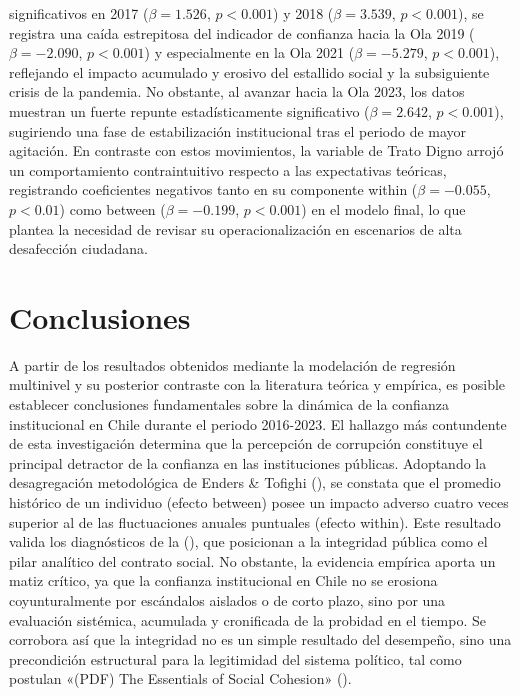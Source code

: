 \documentclass[
  spanish,
  a4paper,
  oneside]{scrbook}
\begin{document}
significativos en 2017 (\(\beta = 1.526\), \(p < 0.001\)) y 2018
(\(\beta = 3.539\), \(p < 0.001\)), se registra una caída estrepitosa
del indicador de confianza hacia la Ola 2019 (\(\beta = -2.090\),
\(p < 0.001\)) y especialmente en la Ola 2021 (\(\beta = -5.279\),
\(p < 0.001\)), reflejando el impacto acumulado y erosivo del estallido
social y la subsiguiente crisis de la pandemia. No obstante, al avanzar
hacia la Ola 2023, los datos muestran un fuerte repunte estadísticamente
significativo (\(\beta = 2.642\), \(p < 0.001\)), sugiriendo una fase de
estabilización institucional tras el periodo de mayor agitación. En
contraste con estos movimientos, la variable de Trato Digno arrojó un
comportamiento contraintuitivo respecto a las expectativas teóricas,
registrando coeficientes negativos tanto en su componente within
(\(\beta = -0.055\), \(p < 0.01\)) como between (\(\beta = -0.199\),
\(p < 0.001\)) en el modelo final, lo que plantea la necesidad de
revisar su operacionalización en escenarios de alta desafección
ciudadana.


\chapter{Conclusiones}\label{conclusiones}

A partir de los resultados obtenidos mediante la modelación de regresión
multinivel y su posterior contraste con la literatura teórica y
empírica, es posible establecer conclusiones fundamentales sobre la
dinámica de la confianza institucional en Chile durante el periodo
2016-2023. El hallazgo más contundente de esta investigación determina
que la percepción de corrupción constituye el principal detractor de la
confianza en las instituciones públicas. Adoptando la desagregación
metodológica de Enders \& Tofighi
(), se constata que el
promedio histórico de un individuo (efecto between) posee un impacto
adverso cuatro veces superior al de las fluctuaciones anuales puntuales
(efecto within). Este resultado valida los diagnósticos de la
(), que
posicionan a la integridad pública como el pilar analítico del contrato
social. No obstante, la evidencia empírica aporta un matiz crítico, ya
que la confianza institucional en Chile no se erosiona coyunturalmente
por escándalos aislados o de corto plazo, sino por una evaluación
sistémica, acumulada y cronificada de la probidad en el tiempo. Se
corrobora así que la integridad no es un simple resultado del desempeño,
sino una precondición estructural para la legitimidad del sistema
político, tal como postulan {«({PDF}) {The Essentials} of {Social
Cohesion}»} ().
\end{document}
